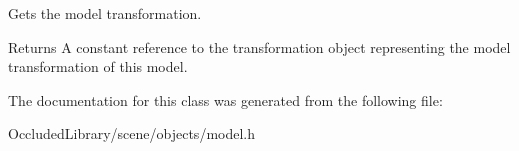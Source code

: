 Gets the model transformation. 

\begin{DoxyReturn}{Returns}
A constant reference to the transformation object representing the model transformation of this model. 
\end{DoxyReturn}


The documentation for this class was generated from the following file\+:\begin{DoxyCompactItemize}
\item 
Occluded\+Library/scene/objects/model.\+h\end{DoxyCompactItemize}
